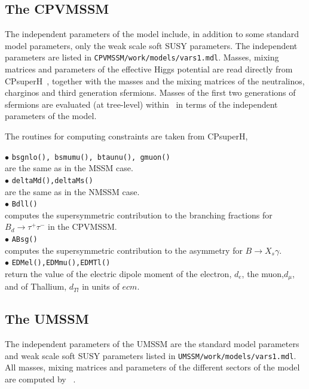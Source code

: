 \documentclass[12pt,a4paper]{article}
\begin{document}
\subsection{The CPVMSSM}

The independent parameters of the model include,
in addition to some standard model parameters, only the weak scale soft SUSY parameters.
The independent parameters are listed in \verb|CPVMSSM/work/models/vars1.mdl|. 
Masses,
mixing matrices and parameters of the effective Higgs potential are read
directly from CPsuperH~\cite{Lee:2003nta,Lee:2007gn}, together with the masses and
the mixing matrices of the neutralinos, charginos and third generation
sfermions.  Masses of the first two generations
of sfermions are evaluated (at tree-level) within \micro\ in
terms of the independent parameters of the model.

The routines for computing constraints are taken from CPsuperH,~\cite{CPSUPERH}


\noindent
$\bullet$ {\tt bsgnlo(), bsmumu(), btaunu(), gmuon() }\\  
are the same as in the MSSM case.\\

\noindent$\bullet$ \verb|deltaMd(),deltaMs()|\\
are the same as in the NMSSM case.\\ 

\noi$\bullet$ \verb|Bdll()|\\
computes the supersymmetric contribution to the branching fractions for
${B}_d\rightarrow\tau^+\tau^-$ in the CPVMSSM.\\ 

\noi$\bullet$ \verb|ABsg()|\\
computes the supersymmetric contribution to the asymmetry for  ${B}\rightarrow X_s\gamma$.\\ 


\noindent$\bullet$ \verb|EDMel(),EDMmu(),EDMTl()|\\
return the  value of the
electric dipole moment of the electron, $d_e$, the muon,$d_\mu$,   
and of Thallium, $d_{Tl}$ in units of $ecm$. 

\subsection{The UMSSM}

The independent parameters of the UMSSM are the standard model
parameters and weak scale soft SUSY parameters listed in \verb|UMSSM/work/models/vars1.mdl|.
All  masses, mixing matrices and parameters of the different sectors of the model
are computed by \micro~\cite{DaSilva:2013jga,Belanger:2015cra}.
\end{document}

